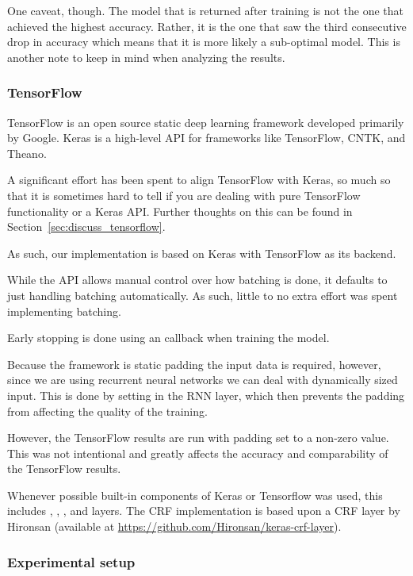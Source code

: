 One caveat, though. The model that is returned after training is not the one
that achieved the highest accuracy. Rather, it is the one that saw the third
consecutive drop in accuracy which means that it is more likely a sub-optimal
model. This is another note to keep in mind when analyzing the results.


\subsubsection*{TensorFlow}\label{sec:tf_conf}

TensorFlow is an open source static deep learning framework developed primarily
by Google. Keras is a high-level API for frameworks like TensorFlow, CNTK, and
Theano.

A significant effort has been spent to align TensorFlow with Keras, so much so
that it is sometimes hard to tell if you are dealing with pure TensorFlow
functionality or a Keras API\@. Further thoughts on this can be found in
Section~\ref{sec:discuss_tensorflow}.

As such, our implementation is based on Keras with TensorFlow as its backend.

While the API allows manual control over how batching is done, it defaults to
just handling batching automatically. As such, little to no extra effort was
spent implementing batching.

Early stopping is done using an  callback when training the
model.

Because the framework is static padding the input data is required, however,
since we are using recurrent neural networks we can deal with dynamically sized
input. This is done by setting  in the RNN layer, which
then prevents the padding from affecting the quality of the training.

However, the TensorFlow results are run with padding set to a non-zero value.
This was not intentional and greatly affects the accuracy and comparability of
the TensorFlow results.

Whenever possible built-in components of Keras or Tensorflow was used, this
includes , , , and  layers.
The CRF implementation is based upon a CRF layer by
Hironsan (available at \url{https://github.com/Hironsan/keras-crf-layer}).

\subsubsection{Experimental setup}

